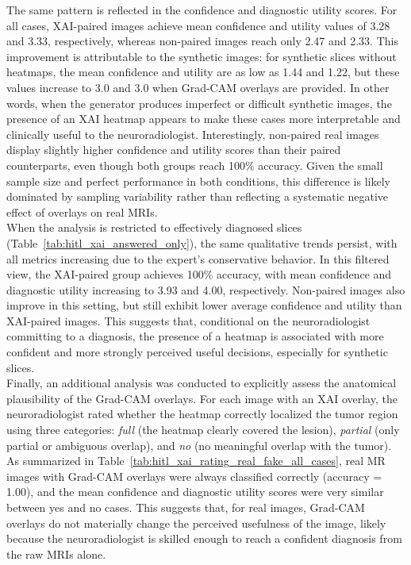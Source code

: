 The same pattern is reflected in the confidence and diagnostic utility scores. For all cases, XAI-paired images achieve mean confidence and utility values of 3.28 and 3.33, respectively, whereas non-paired images reach only 2.47 and 2.33. This improvement is attributable to the synthetic images: for synthetic slices without heatmaps, the mean confidence and utility are as low as 1.44 and 1.22, but these values increase to 3.0 and 3.0 when Grad-CAM overlays are provided. In other words, when the generator produces imperfect or difficult synthetic images, the presence of an XAI heatmap appears to make these cases more interpretable and clinically useful to the neuroradiologist. Interestingly, non-paired real images display slightly higher confidence and utility scores than their paired counterparts, even though both groups reach 100\% accuracy. Given the small sample size and perfect performance in both conditions, this difference is likely dominated by sampling variability rather than reflecting a systematic negative effect of overlays on real MRIs.\\

When the analysis is restricted to effectively diagnosed slices (Table~\ref{tab:hitl_xai_answered_only}), the same qualitative trends persist, with all metrics increasing due to the expert's conservative behavior. In this filtered view, the XAI-paired group achieves 100\% accuracy, with mean confidence and diagnostic utility increasing to 3.93 and 4.00, respectively. Non-paired images also improve in this setting, but still exhibit lower average confidence and utility than XAI-paired images. This suggests that, conditional on the neuroradiologist committing to a diagnosis, the presence of a heatmap is associated with more confident and more strongly perceived useful decisions, especially for synthetic slices.\\

Finally, an additional analysis was conducted to explicitly assess the anatomical plausibility of the Grad-CAM overlays. For each image with an XAI overlay, the neuroradiologist rated whether the heatmap correctly localized the tumor region using three categories: \emph{full} (the heatmap clearly covered the lesion), \emph{partial} (only partial or ambiguous overlap), and \emph{no} (no meaningful overlap with the tumor). As summarized in Table~\ref{tab:hitl_xai_rating_real_fake_all_cases}, real MR images with Grad-CAM overlays were always classified correctly (accuracy = 1.00), and the mean confidence and diagnostic utility scores were very similar between yes and no cases. This suggests that, for real images, Grad-CAM overlays do not materially change the perceived usefulness of the image, likely because the neuroradiologist is skilled enough to reach a confident diagnosis from the raw MRIs alone.\\


